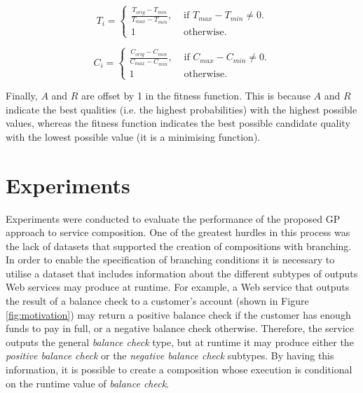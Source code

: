 \documentclass[conference]{IEEEtran}
\begin{document}
\begin{equation}
T_i = \begin{cases}
     \frac{T_{orig} - T_{min}}{T_{max} - T_{min}}, & \text{ if $T_{max} - T_{min} \neq 0$}.\\
     1 & \text{ otherwise}.
    \end{cases}
\end{equation}

\begin{equation}
C_i = \begin{cases}
     \frac{C_{orig} - C_{min}}{C_{max} - C_{min}}, & \text{ if $C_{max} - C_{min} \neq 0$}.\\
     1 & \text{ otherwise}.
    \end{cases}
\end{equation}

Finally, $A$ and $R$ are offset by 1 in the fitness function. This is because $A$ and $R$ indicate the best qualities (i.e. the highest probabilities) with the highest possible values, whereas the fitness function indicates the best possible candidate quality with the lowest possible value (it is a minimising function).

\section{Experiments}\label{experiments}

Experiments were conducted to evaluate the performance of the proposed GP approach to service composition. One of the greatest hurdles in this process was the lack of datasets that supported the creation of compositions with branching. In order to enable the specification of branching conditions it is necessary to utilise a dataset that includes information about the different subtypes of outputs Web services may produce at runtime. For example, a Web service that outputs the result of a balance check to a customer's account (shown in Figure \ref{fig:motivation}) may return a positive balance check if the customer has enough funds to pay in full, or a negative balance check otherwise. Therefore, the service outputs the general \textit{balance check} type, but at runtime it may produce either the \textit{positive balance check} or the \textit{negative balance check} subtypes. By having this information, it is possible to create a composition whose execution is conditional on the runtime value of \textit{balance check}.
\end{document}
